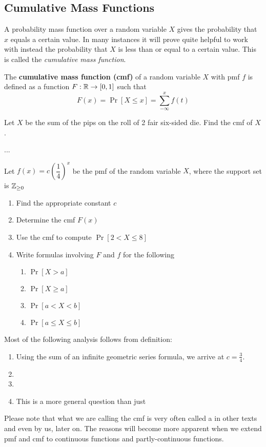 \documentclass[../main.tex]{subfiles}
\begin{document}
\subsection{Cumulative Mass Functions}
A probability mass function over a random variable $X$ gives the probability 
that $x$ equals a certain value. In many instances it will prove quite helpful 
to work with instead the probability that $X$ is less than or equal to a 
certain value. This is called the \textit{cumulative mass function}.
\begin{definition}
The \textbf{cumulative mass function (cmf)} of a random variable $X$ with 
pmf $f$ is defined as a function $F: \mathbb{R}\rightarrow[0,1]$ such that
$$F(x) = \Pr[X \leq x] = \sum_{-\infty}^x f(t)$$
\end{definition}
\begin{example}Let $X$ be the sum of the pips on the roll of 2 fair six-sided
die. Find the cmf of $X$.
\end{example}
\begin{solution}
...
\end{solution}
\begin{example}
Let $f(x) = c\left(\dfrac{1}{4}\right)^x$ be the pmf of the random variable $X$, where the support set is $\mathbb{Z}_{\geq 0}$ 
\begin{enumerate}
\item Find the appropriate constant $c$
\item Determine the cmf $F(x)$
\item Use the cmf to compute $\Pr[2 < X \leq 8]$
\item Write formulas involving $F$ and $f$ for the following
    \begin{enumerate}
        \item $\Pr[X > a]$
        \item $\Pr[X \geq a]$
        \item $\Pr[a < X < b]$
        \item $\Pr[a \leq X \leq b]$
    \end{enumerate}
\end{enumerate}
\begin{solution}
Most of the following analysis follows from definition: 
\begin{enumerate}
    \item Using the sum of an infinite geometric series formula, we arrive at $c = \frac 34$. 
    \item 
    \item 
    \item This is a more general question than just 
\end{enumerate}
\end{solution}
\begin{remark}
Please note that what we are calling the cmf is very often called a  in other texts and even by us, later on. The reasons will become more apparent when we extend pmf and cmf to continuous functions and partly-continuous functions.
\end{remark}
\end{example}
\end{document}
